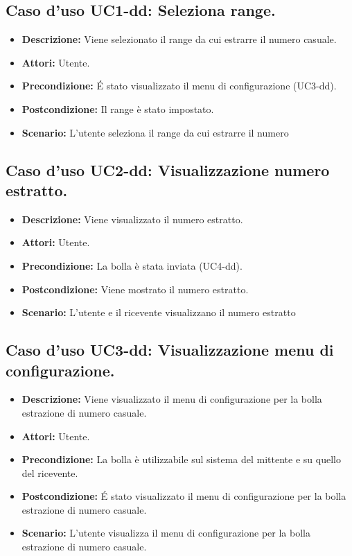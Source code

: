 \subsection{Caso d'uso UC1-dd: Seleziona range.}
\begin{itemize}
\item[]\textbf{Descrizione:} Viene selezionato il range da cui estrarre il numero casuale.
\item[]\textbf{Attori:} Utente. 
\item[]\textbf{Precondizione:} \'E stato visualizzato il menu di configurazione (UC3-dd). 
\item[]\textbf{Postcondizione:} Il range è stato impostato. 
\item[]\textbf{Scenario:}
L'utente seleziona il range da cui estrarre il numero 
\end{itemize}

\subsection{Caso d'uso UC2-dd: Visualizzazione numero estratto.}
\begin{itemize}
\item[]\textbf{Descrizione:} Viene visualizzato il numero estratto.
\item[]\textbf{Attori:} Utente. 
\item[]\textbf{Precondizione:} La bolla è stata inviata (UC4-dd). 
\item[]\textbf{Postcondizione:} Viene mostrato il numero estratto. 
\item[]\textbf{Scenario:}
L'utente e il ricevente visualizzano il numero estratto 
\end{itemize}

\subsection{Caso d'uso UC3-dd: Visualizzazione menu di configurazione.}
\begin{itemize}
\item[]\textbf{Descrizione:} Viene visualizzato il menu di configurazione per la bolla estrazione di numero casuale.
\item[]\textbf{Attori:} Utente. 
\item[]\textbf{Precondizione:} La bolla è utilizzabile sul sistema del mittente e su quello del ricevente. 
\item[]\textbf{Postcondizione:} \'E stato visualizzato il menu di configurazione per la bolla estrazione di numero casuale. 
\item[]\textbf{Scenario:}
L'utente visualizza il menu di configurazione per la bolla estrazione di numero casuale. 
\end{itemize}


